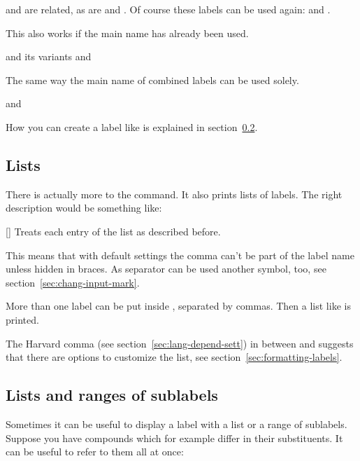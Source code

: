 \documentclass[load-preamble+,babel-options={english,american}]{cnltx-doc}
\begin{document}
\begin{example}
   and  are related, as are  and
  .  Of course these labels can be used again:  and
  .
\end{example}

This also works if the main name has already been used.
\begin{example}
   and its variants  and 
\end{example}

The same way the main name of combined labels can be used solely.
\begin{example}
   and 
\end{example}

How you can create a label like  is explained in
section~\ref{sec:lists-rang-subl}.

\subsection{Lists}\label{sec:lists}
There is actually more to the  command.  It also prints lists of
labels.  The right description would be something like:
\begin{commands}
  []
    Treats each entry of the list as described before.
\end{commands}
This means that with default settings the comma can't be part of the label
name unless hidden in braces.  As separator can be used another symbol, too,
see section~\ref{sec:chang-input-mark}.

\begin{example}
  More than one label can be put inside , separated by commas.  Then
  a list like  is printed.
\end{example}
The Harvard comma (see section~\ref{sec:lang-depend-sett}) in 
between  and  suggests that there are options to customize
the list, see section~\ref{sec:formatting-labels}.

\subsection{Lists and ranges of sublabels}\label{sec:lists-rang-subl}
Sometimes it can be useful to display a label with a list or a range of
sublabels.  Suppose you have compounds
 which for example differ in their
substituents.  It can be useful to refer to them all at once:
\end{document}
